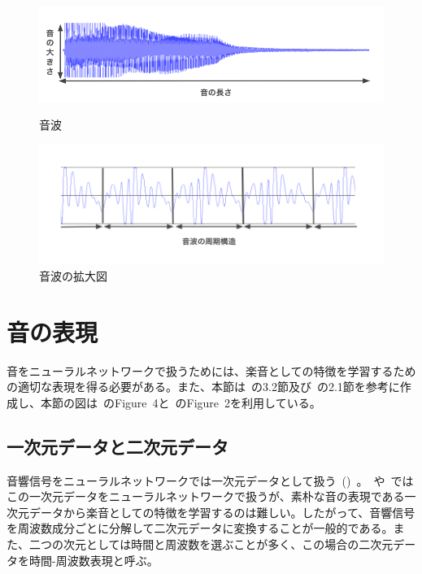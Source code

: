 \begin{figure}[b]
\centering
\begin{minipage}{0.48\columnwidth}
\centering
\includegraphics[width=\columnwidth]{figure/gakuon1.png}
\caption{音波}
\label{fig:gakuon1}
\end{minipage}
\begin{minipage}{0.48\columnwidth}
\centering
\includegraphics[width=\columnwidth]{figure/gakuon2.png}
\caption{音波の拡大図}
\label{fig:gakuon2}
\end{minipage}
\end{figure}

\clearpage

\section{音の表現}

音をニューラルネットワークで扱うためには、楽音としての特徴を学習するための適切な表現を得る必要がある。また、本節は~\cite{musictutorial}の3.2節及び~\cite{timbretron}の2.1節を参考に作成し、本節の図は~\cite{musictutorial}のFigure~4と~\cite{timbretron}のFigure~2を利用している。

\subsection{一次元データと二次元データ}

音響信号をニューラルネットワークでは一次元データとして扱う~()~。~\cite{Jukebox}や~\cite{WaveNet}ではこの一次元データをニューラルネットワークで扱うが、素朴な音の表現である一次元データから楽音としての特徴を学習するのは難しい。したがって、音響信号を周波数成分ごとに分解して二次元データに変換することが一般的である。また、二つの次元としては時間と周波数を選ぶことが多く、この場合の二次元データを時間-周波数表現と呼ぶ。

